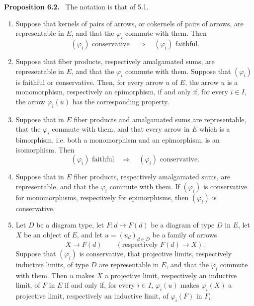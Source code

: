 \documentclass[11pt]{article}
\newenvironment{statement}[1]{\par\medskip\noindent\textbf{#1.}\ }{\par\medskip}
\begin{document}
\begin{statement}{Proposition 6.2}
The notation is that of 5.1.
\begin{enumerate}[label=(\roman*)]
\item Suppose that kernels of pairs of arrows, or cokernels of pairs of arrows, are representable in $E$, and that the $\varphi_i$ commute with them. Then
\[
(\varphi_i)\text{ conservative}\quad\Longrightarrow\quad (\varphi_i)\text{ faithful}.
\]

\item Suppose that fiber products, respectively amalgamated sums, are representable in $E$, and that the $\varphi_i$ commute with them. Suppose that $(\varphi_i)$ is faithful or conservative. Then, for every arrow $u$ of $E$, the arrow $u$ is a monomorphism, respectively an epimorphism, if and only if, for every $i\in I$, the arrow $\varphi_i(u)$ has the corresponding property.

\item Suppose that in $E$ fiber products and amalgamated sums are representable, that the $\varphi_i$ commute with them, and that every arrow in $E$ which is a bimorphism, i.e. both a monomorphism and an epimorphism, is an isomorphism. Then
\[
(\varphi_i)\text{ faithful}\quad\Longrightarrow\quad (\varphi_i)\text{ conservative}.
\]

\item Suppose that in $E$ fiber products, respectively amalgamated sums, are representable, and that the $\varphi_i$ commute with them. If $(\varphi_i)$ is conservative for monomorphisms, respectively for epimorphisms, then $(\varphi_i)$ is conservative.

\item Let $D$ be a diagram type, let $F:d\mapsto F(d)$ be a diagram of type $D$ in $E$, let $X$ be an object of $E$, and let $u=(u_d)_{d\in D}$ be a family of arrows
\[
X\longrightarrow F(d)\qquad (\text{respectively }F(d)\longrightarrow X).
\]
Suppose that $(\varphi_i)$ is conservative, that projective limits, respectively inductive limits, of type $D$ are representable in $E$, and that the $\varphi_i$ commute with them. Then $u$ makes $X$ a projective limit, respectively an inductive limit, of $F$ in $E$ if and only if, for every $i\in I$, $\varphi_i(u)$ makes $\varphi_i(X)$ a projective limit, respectively an inductive limit, of $\varphi_i(F)$ in $F_i$.
\end{enumerate}
\end{statement}
\end{document}
